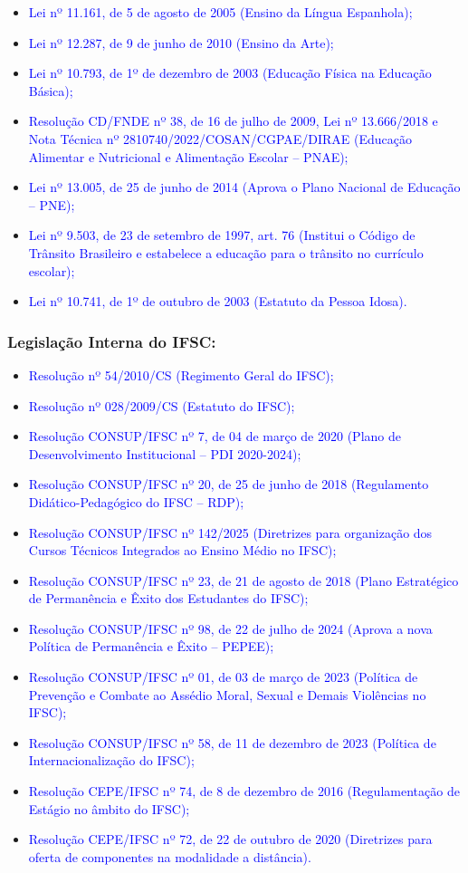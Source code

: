 \documentclass{../../modelos/latex-shared/ifsc-ppc}
\newcommand{\revisao}[1]{\textcolor{blue}{#1}}
\newcommand{\revisao}[1]{#1}
\begin{document}
\begin{itemize}
    \item \revisao{Lei nº 11.161, de 5 de agosto de 2005 (Ensino da Língua Espanhola);}
    \item \revisao{Lei nº 12.287, de 9 de junho de 2010 (Ensino da Arte);}
    \item \revisao{Lei nº 10.793, de 1º de dezembro de 2003 (Educação Física na Educação Básica);}
    \item \revisao{Resolução CD/FNDE nº 38, de 16 de julho de 2009, Lei nº 13.666/2018 e Nota Técnica nº 2810740/2022/COSAN/CGPAE/DIRAE (Educação Alimentar e Nutricional e Alimentação Escolar -- PNAE);}
    \item \revisao{Lei nº 13.005, de 25 de junho de 2014 (Aprova o Plano Nacional de Educação -- PNE);}
    \item \revisao{Lei nº 9.503, de 23 de setembro de 1997, art. 76 (Institui o Código de Trânsito Brasileiro e estabelece a educação para o trânsito no currículo escolar);}
    \item \revisao{Lei nº 10.741, de 1º de outubro de 2003 (Estatuto da Pessoa Idosa).}
\end{itemize}

\subsubsection{Legislação Interna do IFSC:}
\begin{itemize}
    \item \revisao{Resolução nº 54/2010/CS (Regimento Geral do IFSC);}
    \item \revisao{Resolução nº 028/2009/CS (Estatuto do IFSC);}
    \item \revisao{Resolução CONSUP/IFSC nº 7, de 04 de março de 2020 (Plano de Desenvolvimento Institucional -- PDI 2020-2024);}
    \item \revisao{Resolução CONSUP/IFSC nº 20, de 25 de junho de 2018 (Regulamento Didático-Pedagógico do IFSC -- RDP);}
    \item \revisao{Resolução CONSUP/IFSC nº 142/2025 (Diretrizes para organização dos Cursos Técnicos Integrados ao Ensino Médio no IFSC);}
    \item \revisao{Resolução CONSUP/IFSC nº 23, de 21 de agosto de 2018 (Plano Estratégico de Permanência e Êxito dos Estudantes do IFSC);}
    \item \revisao{Resolução CONSUP/IFSC nº 98, de 22 de julho de 2024 (Aprova a nova Política de Permanência e Êxito -- PEPEE);}
    \item \revisao{Resolução CONSUP/IFSC nº 01, de 03 de março de 2023 (Política de Prevenção e Combate ao Assédio Moral, Sexual e Demais Violências no IFSC);}
    \item \revisao{Resolução CONSUP/IFSC nº 58, de 11 de dezembro de 2023 (Política de Internacionalização do IFSC);}
    \item \revisao{Resolução CEPE/IFSC nº 74, de 8 de dezembro de 2016 (Regulamentação de Estágio no âmbito do IFSC);}
    \item \revisao{Resolução CEPE/IFSC nº 72, de 22 de outubro de 2020 (Diretrizes para oferta de componentes na modalidade a distância).}
\end{itemize}
\end{document}
